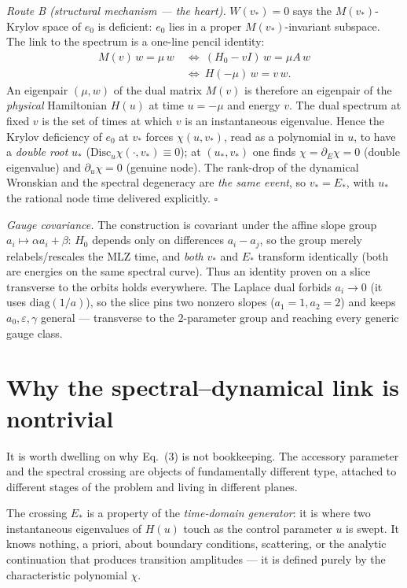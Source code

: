 \documentclass[aps,prl,reprint,nofootinbib,superscriptaddress]{revtex4-2}
\newcommand{\eps}{\varepsilon}
\newcommand{\diag}{\mathrm{diag}}
\newcommand{\Disc}{\mathrm{Disc}}
\begin{document}
\emph{Route B (structural mechanism --- the heart).} $W(v_*)=0$ says the $M(v_*)$-Krylov space of
$e_0$ is deficient: $e_0$ lies in a proper $M(v_*)$-invariant subspace. The link to the spectrum is a
one-line pencil identity:
\begin{equation}
\begin{aligned}
M(v)\,w=\mu\,w
  &\ \Longleftrightarrow\ (H_0-vI)\,w=\mu A\,w\\
  &\ \Longleftrightarrow\ H(-\mu)\,w=v\,w .
\end{aligned}
\label{eq:duality}
\end{equation}
An eigenpair $(\mu,w)$ of the dual matrix $M(v)$ is therefore an eigenpair of the \emph{physical}
Hamiltonian $H(u)$ at time $u=-\mu$ and energy $v$. The dual spectrum at fixed $v$ is the set of times
at which $v$ is an instantaneous eigenvalue. Hence the Krylov deficiency of $e_0$ at $v_*$ forces
$\chi(u,v_*)$, read as a polynomial in $u$, to have a \emph{double root} $u_*$
($\Disc_u\chi(\cdot,v_*)\equiv0$); at $(u_*,v_*)$ one finds $\chi=\partial_E\chi=0$ (double eigenvalue)
and $\partial_u\chi=0$ (genuine node). The rank-drop of the dynamical Wronskian and the spectral
degeneracy are \emph{the same event}, so $v_*=E_*$, with $u_*$ the rational node time delivered
explicitly. $\square$

\emph{Gauge covariance.} The construction is covariant under the affine slope group
$a_i\mapsto\alpha a_i+\beta$: $H_0$ depends only on differences $a_i-a_j$, so the group merely
relabels/rescales the MLZ time, and \emph{both} $v_*$ and $E_*$ transform identically (both are
energies on the same spectral curve). Thus an identity proven on a slice transverse to the orbits holds
everywhere. The Laplace dual forbids $a_i\to0$ (it uses $\diag(1/a)$), so the slice pins two nonzero
slopes ($a_1{=}1,a_2{=}2$) and keeps $a_0,\eps,\gamma$ general --- transverse to the $2$-parameter group
and reaching every generic gauge class.

\section{Why the spectral--dynamical link is nontrivial}
It is worth dwelling on why Eq.~(3) is not bookkeeping. The accessory parameter and the spectral
crossing are objects of fundamentally different type, attached to different stages of the problem and
living in different planes.

The crossing $E_*$ is a property of the \emph{time-domain generator}: it is where two instantaneous
eigenvalues of $H(u)$ touch as the control parameter $u$ is swept. It knows nothing, a priori, about
boundary conditions, scattering, or the analytic continuation that produces transition amplitudes ---
it is defined purely by the characteristic polynomial $\chi$.
\end{document}
